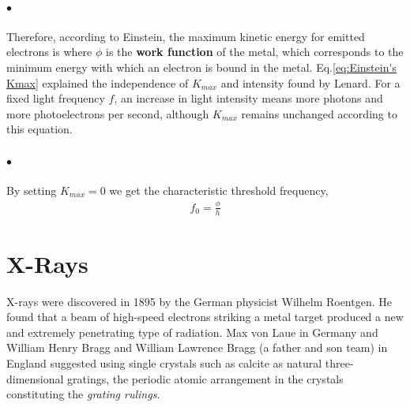 \documentclass[a4paper]{report}
\begin{document}
            \paragraph{$\bullet$} Therefore, according to Einstein, the maximum kinetic energy for emitted electrons is
            where $\phi$ is the \textbf{work function} of the metal, which corresponds to the minimum energy 
            with which an electron is bound in the metal.
            Eq.\eqref{eq:Einstein's Kmax} explained the independence of $K_{max}$ and intensity found by Lenard. 
            For a fixed light frequency $f$, an increase in light intensity means more photons and more photoelectrons 
            per second, although $K_{max}$ remains unchanged according to this equation.

            \paragraph{$\bullet$} By setting $K_{max}=0$ we get the characteristic threshold frequency,
            \begin{align}
                \label{eq:threshold frequency}
                f_0 = \frac{\phi}{h}
            \end{align}

        \section{X-Rays}
            X-rays were discovered in 1895 by the German physicist Wilhelm Roentgen. 
            He found that a beam of high-speed electrons striking a metal target produced a new and extremely penetrating type of radiation.
            Max von Laue in Germany and William Henry Bragg and William Lawrence Bragg (a father and son team) in 
            England suggested using single crystals such as calcite as natural three-dimensional gratings, the 
            periodic atomic arrangement in the crystals constituting the \textit{grating rulings}.
\end{document}
